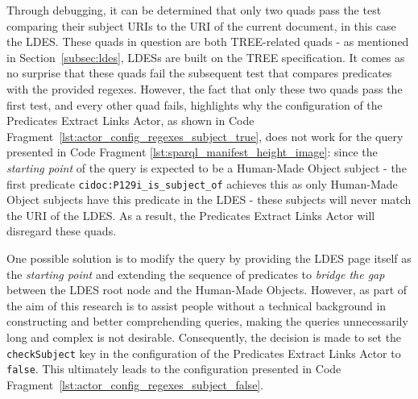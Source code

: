 Through debugging, it can be determined that only two quads pass the test comparing their subject URIs to the URI of the current document, in this case the LDES. These quads in question are both TREE-related quads - as mentioned in Section~\ref{subsec:ldes}, LDESs are built on the TREE specification. It comes as no surprise that these quads fail the subsequent test that compares predicates with the provided regexes. However, the fact that only these two quads pass the first test, and every other quad fails, highlights why the configuration of the Predicates Extract Links Actor, as shown in Code Fragment~\ref{lst:actor_config_regexes_subject_true}, does not work for the query presented in Code Fragment \ref{lst:sparql_manifest_height_image}: since the \textit{starting point} of the query is expected to be a Human-Made Object subject - the first predicate \texttt{cidoc:P129i_is_subject_of} achieves this as only Human-Made Object subjects have this predicate in the LDES - these subjects will never match the URI of the LDES. As a result, the Predicates Extract Links Actor will disregard these quads.

One possible solution is to modify the query by providing the LDES page itself as the \textit{starting point} and extending the sequence of predicates to \textit{ bridge the gap} between the LDES root node and the Human-Made Objects. However, as part of the aim of this research is to assist people without a technical background in constructing and better comprehending queries, making the queries unnecessarily long and complex is not desirable. Consequently, the decision is made to set the \texttt{checkSubject} key in the configuration of the Predicates Extract Links Actor to \texttt{false}. This ultimately leads to the configuration presented in Code Fragment~\ref{lst:actor_config_regexes_subject_false}.

